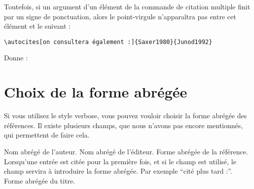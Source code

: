 Toutefois, si un argument  d'un élément de la commande de citation multiple finit par un signe de ponctuation, alors le point-virgule n'apparaîtra pas entre cet élément et le suivant :

\begin{verbatim}
\autocites[on consultera également :]{Saxer1980}{Junod1992}
\end{verbatim}

Donne :

\begin{quotation}
\cites[on consultera également :]{Saxer1980}{Junod1992}
\end{quotation}

\cite[24]{Junod1992}


\section{Choix de la forme abrégée}\label{shortfields}

Si vous utilisez le style verbose, vous pouvez vouloir choisir la forme abrégée des références. Il existe plusieurs champs, que nous n'avons pas encore mentionnés, qui permettent de faire cela.

\begin{fieldlist}
	 Nom abrégé de l'auteur.
	 Nom abrégé de l'éditeur.
	 Forme abrégée de la référence.
	 Lorsqu'une entrée est citée pour la première fois, et si le champ  est utilisé, le champ  servira à introduire la forme abrégée. Par exemple \enquote{cité plus tard :}.
	 Forme abrégée du titre.
\end{fieldlist}

